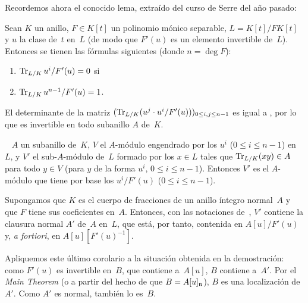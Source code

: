 Recordemos ahora el conocido lema, extraído del curso de Serre del año pasado:

\begin{lemme}
\label{I.9.6}
Sean $K$ un anillo, $F\in K[t]$ un polinomio mónico separable, $L=K[t]/FK[t]$ y $u$ la clase de~$t$ en~$L$ (de modo que $F'(u)$ es un elemento invertible de~$L$). Entonces se tienen las fórmulas siguientes (donde $n=\deg F$):
\begin{enumerate}
\item[] $\operatorname{Tr}_{L/K}u^i/F'(u)=0$ si %
\item[] $\operatorname{Tr}_{L/K}u^{n-1}/F'(u)=1$.
\end{enumerate}
\end{lemme}

\begin{corollaire}
\label{I.9.7}
El determinante de la matriz $(\operatorname{Tr}_{L/K}(u^j\cdot u^i/F'(u)))_{0\leq i,j\leq n-1}$ es igual a
,
por lo que es invertible en todo subanillo $A$ de~$K$.
\end{corollaire}

\begin{corollaire}
\label{I.9.8}
\ %
$A$ un subanillo de~$K$, $V$ el $A$-módulo engendrado por los $u^i$ ($0\leq i\leq n-1$) en~$L$, y $V'$ el sub-$A$-módulo de~$L$ formado por los $x\in L$ tales que $\operatorname{Tr}_{L/K}(xy)\in A$ para todo $y\in V$ (\ie para $y$ de la forma $u^i$, $0\leq i\leq n-1$). Entonces $V'$ es el $A$-módulo que tiene por base los $u^i/F'(u)$ ($0\leq i\leq n-1$).
\end{corollaire}

\begin{corollaire}
\label{I.9.9}
Supongamos que $K$ es el cuerpo de fracciones de un anillo íntegro normal~$A$ y que $F$ tiene sus coeficientes en~$A$. Entonces, con las notaciones de~, $V'$ contiene la clausura normal $A'$ de~$A$ en~$L$, que está, por tanto, contenida en $A[u]/F'(u)$ y, \emph{a fortiori}, en $A[u][F'(u)^{-1}]$.
\end{corollaire}

Apliquemos este último corolario a la situación obtenida en la demostración: como $F'(u)$ es invertible en~$B$, que contiene a~$A[u]$, $B$ contiene a~$A'$. Por el \emph{Main Theorem} (o a partir del hecho de que $B=A[u]_{\mathfrak{n}}$), $B$ es una localización de~$A'$. Como $A'$ es normal, también lo es~$B$.

